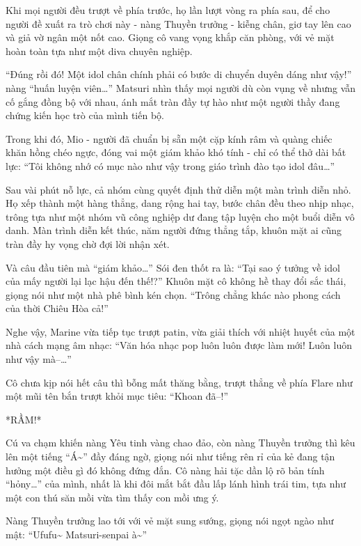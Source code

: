 \documentclass[../main.tex]{subfiles}
\begin{document}
Khi mọi người đều trượt về phía trước, họ lần lượt vòng ra phía sau, để cho người đề xuất ra trò chơi này - nàng Thuyền trưởng - kiễng chân, giơ tay lên cao và giả vờ ngân một nốt cao. Giọng cô vang vọng khắp căn phòng, với vẻ mặt hoàn toàn tựa như một diva chuyên nghiệp.

``Đúng rồi đó! Một idol chân chính phải có bước di chuyển duyên dáng như vậy!'' nàng ``huấn luyện viên\dots'' Matsuri nhìn thấy mọi người dù còn vụng về nhưng vẫn cố gắng đồng bộ với nhau, ánh mắt tràn đầy tự hào như một người thầy đang chứng kiến học trò của mình tiến bộ.

Trong khi đó, Mio - người đã chuẩn bị sẵn một cặp kính râm và quàng chiếc khăn hồng chéo ngực, đóng vai một giám khảo khó tính - chỉ có thể thở dài bất lực: ``Tôi không nhớ có mục nào như vậy trong giáo trình đào tạo idol đâu\dots''

Sau vài phút nỗ lực, cả nhóm cùng quyết định thử diễn một màn trình diễn nhỏ. Họ xếp thành một hàng thẳng, dang rộng hai tay, bước chân đều theo nhịp nhạc, trông tựa như một nhóm vũ công nghiệp dư đang tập luyện cho một buổi diễn vô danh. Màn trình diễn kết thúc, năm người đứng thẳng tắp, khuôn mặt ai cũng tràn đầy hy vọng chờ đợi lời nhận xét.


Và câu đầu tiên mà ``giám khảo\dots'' Sói đen thốt ra là: ``Tại sao ý tưởng về idol của mấy người lại lạc hậu đến thế!?'' Khuôn mặt cô không hề thay đổi sắc thái, giọng nói như một nhà phê bình kén chọn. ``Trông chẳng khác nào phong cách của thời Chiêu Hòa cả!''

Nghe vậy, Marine vừa tiếp tục trượt patin, vừa giải thích với nhiệt huyết của một nhà cách mạng âm nhạc: ``Văn hóa nhạc pop luôn luôn được làm mới! Luôn luôn như vậy mà--\dots''

Cô chưa kịp nói hết câu thì bỗng mất thăng bằng, trượt thẳng về phía Flare như một mũi tên bắn trượt khỏi mục tiêu: ``Khoan đã--!''

*RẦM!*

Cú va chạm khiến nàng Yêu tinh vàng chao đảo, còn nàng Thuyền trưởng thì kêu lên một tiếng ``Á\~{}'' đầy đáng ngờ, giọng nói như tiếng rên rỉ của kẻ đang tận hưởng một điều gì đó không đứng đắn. Cô nàng hải tặc dần lộ rõ bản tính ``hỏny\dots'' của mình, nhất là khi đôi mắt bắt đầu lấp lánh hình trái tim, tựa như một con thú săn mồi vừa tìm thấy con mồi ưng ý.

Nàng Thuyền trưởng lao tới với vẻ mặt sung sướng, giọng nói ngọt ngào như mật: ``Ufufu\~{} Matsuri-senpai à\~{}''
\end{document}

